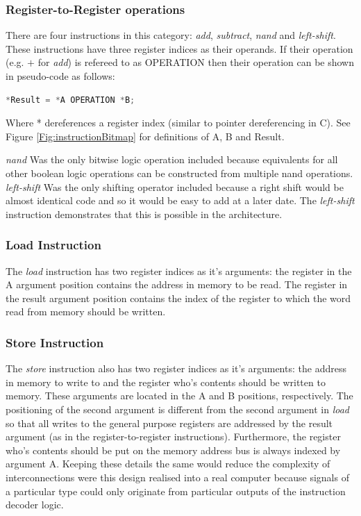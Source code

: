 \documentclass[11pt,a4paper]{IEEEtran}
\begin{document}
			\subsubsection{Register-to-Register operations}
				There are four instructions in this category: \textit{add}, \textit{subtract}, \textit{nand} and \textit{left-shift}. These instructions have three register indices as their operands. If their operation (e.g. $+$ for \textit{add}) is refereed to as OPERATION then their operation can be shown in pseudo-code as follows:
				
				\begin{lstlisting}[language=C]
*Result = *A OPERATION *B;
				\end{lstlisting}
				
				Where * dereferences a register index (similar to pointer dereferencing in C). See Figure \ref{Fig:instructionBitmap} for definitions of A, B and Result.
				
				\textit{nand} Was the only bitwise logic operation included because equivalents for all other boolean logic operations can be constructed from multiple nand operations. \textit{left-shift} Was the only shifting operator included because a right shift would be almost identical code and so it would be easy to add at a later date. The \textit{left-shift} instruction demonstrates that this is possible in the architecture.
				
			\subsubsection{Load Instruction}
				The \textit{load} instruction has two register indices as it's arguments: the register in the A argument position contains the address in memory to be read. The register in the result argument position contains the index of the register to which the word read from memory should be written.
			
			\subsubsection{Store Instruction}
				The \textit{store} instruction also has two register indices as it's arguments: the address in memory to write to and the register who's contents should be written to memory. These arguments are located in the A and B positions, respectively. The positioning of the second argument is different from the second argument in \textit{load} so that all writes to the general purpose registers are addressed by the result argument (as in the register-to-register instructions). Furthermore, the register who's contents should be put on the memory address bus is always indexed by argument A. Keeping these details the same would reduce the complexity of interconnections were this design realised into a real computer because signals of a particular type could only originate from particular outputs of the instruction decoder logic.
			
\end{document}
